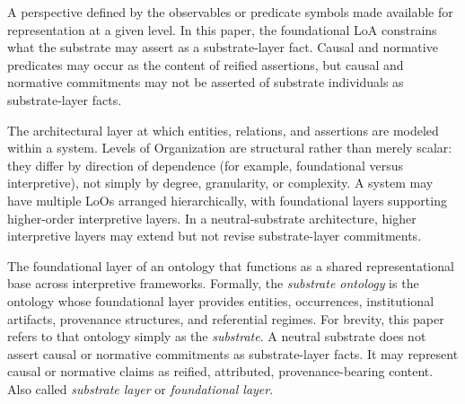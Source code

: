 \begin{description}[style=nextline,leftmargin=1.5cm]

\item[Level of Abstraction (LoA)]
A perspective defined by the observables or predicate symbols
made available for representation at a given level.
In this paper, the foundational LoA constrains what the substrate
may assert as a substrate-layer fact.
Causal and normative predicates may occur as the content
of reified assertions,
but causal and normative commitments may not be asserted
of substrate individuals as substrate-layer facts.

\item[Level of Organization (LoO)]
The architectural layer at which entities, relations,
and assertions are modeled within a system.
Levels of Organization are structural rather than merely scalar:
they differ by direction of dependence
(for example, foundational versus interpretive),
not simply by degree, granularity, or complexity.
A system may have multiple LoOs arranged hierarchically,
with foundational layers supporting higher-order interpretive layers.
In a neutral-substrate architecture,
higher interpretive layers may extend but not revise
substrate-layer commitments.

\item[Substrate]
The foundational layer of an ontology that functions
as a shared representational base across interpretive frameworks.
Formally, the \emph{substrate ontology} is the ontology whose
foundational layer provides entities, occurrences,
institutional artifacts, provenance structures,
and referential regimes.
For brevity, this paper refers to that ontology simply as
the \emph{substrate}.
A neutral substrate does not assert causal or normative commitments
as substrate-layer facts.
It may represent causal or normative claims as reified,
attributed, provenance-bearing content.
Also called \emph{substrate layer} or \emph{foundational layer}.

\end{description}
